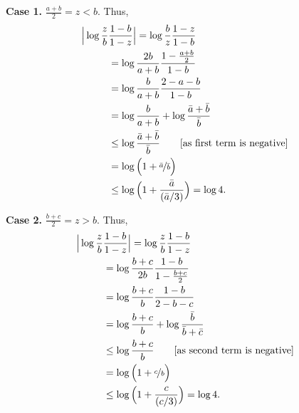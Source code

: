 \begin{lproof}
    \begin{minipage}{0.49\linewidth}
        \textbf{Case 1.} $\frac{a+b}2 = z < b$. Thus,
        \begin{align*}
            \Big| \log \frac zb & \frac{1-b}{1-z} \Big| 
            = \log \frac bz \frac{1-z}{1-b} \\
            &= \log \frac {2b}{a+b} \frac{1-\frac{a+b}2}{1-b} \\
            &= \log \frac {b}{a+b} \frac{2 - a - b}{1-b} \\
            &= \log \frac {b}{a+b} + \log \frac{\bar a + \bar b}{\bar b} \\
            &\le \log \frac{\bar a + \bar b}{\bar b}
                \qquad [\text{as first term is negative}] \\
            &= \log\Big(1 + \nicefrac{\bar a}{\bar b}\Big) \\
            &\le \log \Big(1 + \frac{\bar a}{(\bar a / 3)} \Big)
            = \log 4.
        \end{align*}
    \end{minipage}
    \begin{minipage}{0.49\linewidth}
        \textbf{Case 2.}
        $\frac{b+c}2 = z > b$. Thus,
        \begin{align*}
            \Big| \log \frac zb &\frac{1-b}{1-z} \Big| 
            = \log \frac zb \frac{1-b}{1-z} \\
            &= \log \frac {b+c}{2b} \frac{1-b}{1-\frac{b+c}2} \\
            &= \log \frac {b+c}{b} \frac{1-b}{2 - b - c} \\
            &= \log \frac {b+c}{b} + \log \frac{\bar b}{\bar b + \bar c} \\
            &\le \log \frac{b + c}{b}
                \qquad [\text{as second term is negative}] \\
            &= \log\Big(1 + \nicefrac{c}{b}\Big) \\
            &\le \log \Big(1 + \frac{c}{(c / 3)} \Big)
            = \log 4.
        \end{align*}
    \end{minipage}
    \qedsymbol



\end{lproof}
